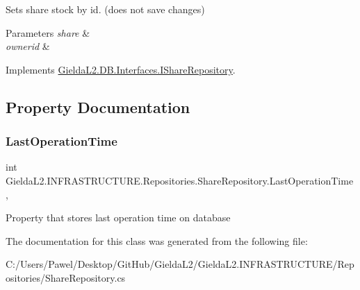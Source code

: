 Sets share stock by id. (does not save changes) 


\begin{DoxyParams}{Parameters}
{\em share} & \\
\hline
{\em ownerid} & \\
\hline
\end{DoxyParams}


Implements \mbox{\hyperlink{interface_gielda_l2_1_1_d_b_1_1_interfaces_1_1_i_share_repository_ac790aa8aa9cb7cbaeb91b0c6201abf76}{Gielda\+L2.\+D\+B.\+Interfaces.\+I\+Share\+Repository}}.



\subsection{Property Documentation}
\mbox{\label{class_gielda_l2_1_1_i_n_f_r_a_s_t_r_u_c_t_u_r_e_1_1_repositories_1_1_share_repository_ad778ea8d672a171a35af26957efe3c88}} 
\subsubsection{\texorpdfstring{LastOperationTime}{LastOperationTime}}
{\footnotesize\ttfamily int Gielda\+L2.\+I\+N\+F\+R\+A\+S\+T\+R\+U\+C\+T\+U\+R\+E.\+Repositories.\+Share\+Repository.\+Last\+Operation\+Time\hspace{0.3cm}{\ttfamily [get]}, {\ttfamily [set]}}



Property that stores last operation time on database 



The documentation for this class was generated from the following file\+:\begin{DoxyCompactItemize}
\item 
C\+:/\+Users/\+Pawel/\+Desktop/\+Git\+Hub/\+Gielda\+L2/\+Gielda\+L2.\+I\+N\+F\+R\+A\+S\+T\+R\+U\+C\+T\+U\+R\+E/\+Repositories/Share\+Repository.\+cs\end{DoxyCompactItemize}
